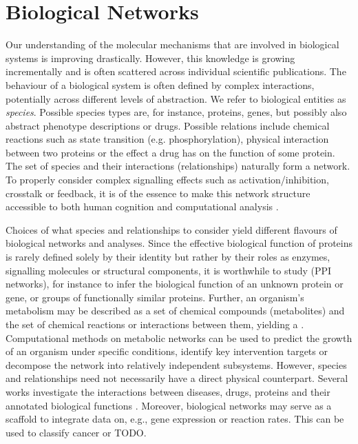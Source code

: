 \documentclass[
	fontsize=10pt, %
	twoside=false, %
	secnumdepth=1, %
]{kaobook}
\begin{document}
\section{Biological Networks}
Our understanding of the molecular mechanisms that are involved in biological
systems is improving drastically. However, this knowledge is growing
incrementally and is often scattered across individual scientific publications.
The behaviour of a biological system is often defined by complex interactions,
potentially across different levels of abstraction. We refer to biological
entities as \textit{species}. Possible species types are, for instance,
proteins, genes, but possibly also abstract phenotype descriptions or drugs.
%
Possible relations include chemical reactions such as state transition (e.g.
phosphorylation), physical interaction between two proteins or the effect a drug
has on the function of some protein.
%
The set of species and their interactions (relationships) naturally form a
network. To properly consider complex signalling effects such as
activation/inhibition, crosstalk or feedback, it is of the essence to make this
network structure accessible to both human cognition and computational analysis
\cite{barabasi_NetworkBiologyUnderstanding_2004}.

Choices of what species and relationships to consider yield different flavours
of biological networks and analyses. Since the effective biological function of
proteins is rarely defined solely by their identity but rather by their roles as
enzymes, signalling molecules or structural components, it is worthwhile to
study  (\textsc{PPI} networks), for
instance to infer the biological function of an unknown protein or gene, or
groups of functionally similar proteins.
Further, an organism's metabolism may
be described as a set of chemical compounds (metabolites) and the set of
chemical reactions or interactions between them, yielding a . Computational methods on metabolic networks can be used to predict the
growth of an organism under specific conditions, identify key intervention
targets or decompose the network into relatively independent subsystems.
However, species and relationships need not necessarily have a direct physical
counterpart. Several works investigate the interactions between diseases, drugs,
proteins and their annotated biological functions
\cite{ruiz_identification_2021} \cite{barabasi_NetworkMedicineNetworkbased_2011}.
Moreover, biological networks may serve as a scaffold to integrate data on,
e.g., gene expression or reaction rates. This can be used to classify cancer
or TODO.
\end{document}
